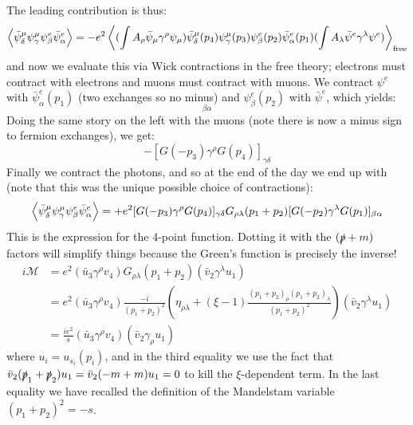 The leading contribution is thus:
\begin{equation}
    \left< \bar{\psi}^\mu_\delta \psi^\mu_\gamma \psi^e_\beta \bar{\psi}^e_\alpha \right> = -e^2\left< (\int A_\rho \bar{\psi}_\mu \gamma^\rho \psi_\mu)\bar{\psi}^\mu_\delta(p_4)\psi_\gamma^\mu(p_3)\psi_\beta^e(p_2)\bar{\psi}^e_\alpha(p_1)(\int A_\lambda \bar{\psi}^e \gamma^\lambda \psi^e) \right>_{\text{free}}
\end{equation}
and now we evaluate this via Wick contractions in the free theory; electrons must contract with electrons and muons must contract with muons. We contract $\psi^e$ with $\bar{\psi}_\alpha^e(p_1)$  (two exchanges so no minus) and $\psi^e_\beta(p_2)$ with $\bar{\psi}^e$, which yields:
\begin{equation}
    [G(-p_2)\gamma^\lambda G(p_1)]_{\beta\alpha}
\end{equation}
Doing the same story on the left with the muons (note there is now a minus sign to fermion exchanges), we get:
\begin{equation}
    -[G(-p_3)\gamma^\rho G(p_4)]_{\gamma\delta}
\end{equation}
Finally we contract the photons, and so at the end of the day we end up with (note that this was the unique possible choice of contractions):
\begin{equation}
    \left< \bar{\psi}^\mu_\delta \psi^\mu_\gamma \psi^e_\beta \bar{\psi}^e_\alpha \right> = +e^2[G(-p_3)\gamma^\rho G(p_4)]_{\gamma\delta}G_{\rho\lambda}(p_1 + p_2)[G(-p_2)\gamma^\lambda G(p_1)]_{\beta\alpha}
\end{equation}
This is the expression for the 4-point function. Dotting it with the $(\slashed{p} + m)$ factors will simplify things because the Green's function is precisely the inverse!
\begin{equation}\label{eq:eemumu}
    \begin{split}
        i\mathcal{M} &= e^2(\bar{u}_3\gamma^\rho v_4)G_{\rho\lambda}(p_1 + p_2)(\bar{v}_2\gamma^\lambda u_1)
        \\ &= e^2(\bar{u}_3\gamma^\rho v_4)\frac{-i}{(p_1 + p_2)^2}(\eta_{\rho\lambda} + (\xi - 1)\frac{(p_1 + p_2)_{\rho}(p_1 + p_2)_\lambda}{(p_1 + p_2)^2})(\bar{v}_2\gamma^\lambda u_1)
        \\ &= \frac{ie^2}{s}(\bar{u}_3\gamma^\rho v_4)(\bar{v}_2\gamma_\rho u_1)
    \end{split}
\end{equation}
where $u_i = u_{s_i}(p_i)$, and in the third equality we use the fact that $\bar{v}_2(\slashed{p}_1 + \slashed{p}_2)u_1 = \bar{v}_2(-m + m)u_1 = 0$ to kill the $\xi$-dependent term. In the last equality we have recalled the definition of the Mandelstam variable $(p_1 + p_2)^2 = -s$.

